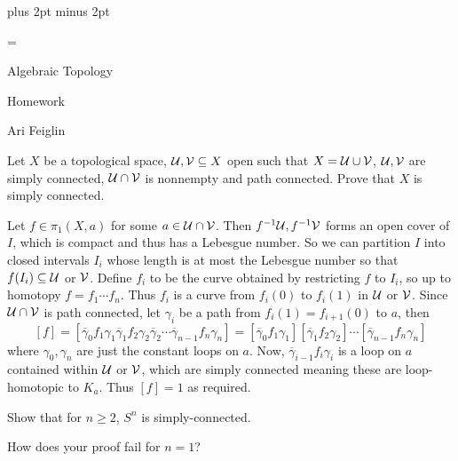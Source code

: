 

\parindent=0pt
\parskip=3pt plus 2pt minus 2pt



\footline={}

\setcounter{section}{4}


\def\printmcount{\the\counter{section}.\the\counter{math counter}}

{

    \centerline{Algebraic Topology}
    \smallskip
    \centerline{Homework \the{}}
    \centerline{Ari Feiglin}

\eppbox}

\bexerc

    Let $X$ be a topological space, ${\cal U},{\cal V}\subseteq X$ open such that $X={\cal U}\cup{\cal V}$, ${\cal U},{\cal V}$ are simply connected, ${\cal U}\cap{\cal V}$ is nonnempty and path connected.
    Prove that $X$ is simply connected.

\eexerc

Let $f\in\pi_1(X,a)$ for some $a\in{\cal U}\cap{\cal V}$.
Then $f^{-1}{\cal U},f^{-1}{\cal V}$ forms an open cover of $I$, which is compact and thus has a Lebesgue number.
So we can partition $I$ into closed intervals $I_i$ whose length is at most the Lebesgue number so that $f(I_i)\subseteq{\cal U}$ or ${\cal V}$.
Define $f_i$ to be the curve obtained by restricting $f$ to $I_i$, so up to homotopy $f=f_1\cdots f_n$.
Thus $f_i$ is a curve from $f_i(0)$ to $f_i(1)$ in ${\cal U}$ or ${\cal V}$.
Since ${\cal U}\cap{\cal V}$ is path connected, let $\gamma_i$ be a path from $f_i(1)=f_{i+1}(0)$ to $a$, then
$$ [f] = [\overline\gamma_0f_1\gamma_1\overline\gamma_1 f_2\gamma_2\overline\gamma_2\cdots\overline\gamma_{n-1}f_n\gamma_n] =
[\overline\gamma_0f_1\gamma_1][\overline\gamma_1f_2\gamma_2]\cdots[\overline\gamma_{n-1}f_n\gamma_n] $$
where $\gamma_0,\gamma_n$ are just the constant loops on $a$.
Now, $\overline\gamma_{i-1}f_i\gamma_i$ is a loop on $a$ contained within ${\cal U}$ or ${\cal V}$, which are simply connected meaning these are loop-homotopic to $K_a$.
Thus $[f]=1$ as required.

\bexerc

    \benum
        \item Show that for $n\geq2$, $S^n$ is simply-connected.
        \item How does your proof fail for $n=1$?
    \eenum

